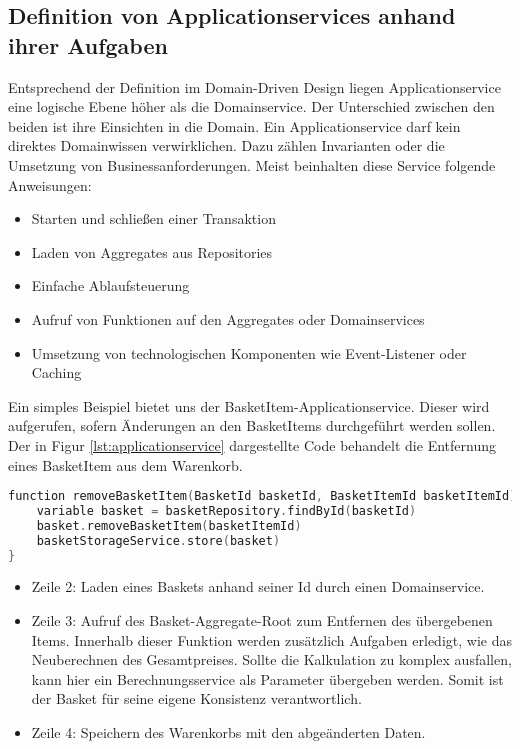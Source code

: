\subsection{Definition von Applicationservices anhand ihrer Aufgaben}

Entsprechend der Definition im Domain-Driven Design liegen Applicationservice eine logische Ebene höher als die Domainservice. Der Unterschied zwischen den beiden ist ihre Einsichten in die Domain. Ein Applicationservice darf kein direktes Domainwissen verwirklichen. Dazu zählen Invarianten oder die Umsetzung von Businessanforderungen.
Meist beinhalten diese Service folgende Anweisungen:

\begin{itemize}[noitemsep,nolistsep]
	\item Starten und schließen einer Transaktion
	\item Laden von Aggregates aus Repositories
	\item Einfache Ablaufsteuerung
	\item Aufruf von Funktionen auf den Aggregates oder Domainservices
	\item Umsetzung von technologischen Komponenten wie Event-Listener oder Caching
\end{itemize}

Ein simples Beispiel bietet uns der BasketItem-Applicationservice. Dieser wird aufgerufen, sofern Änderungen an den BasketItems durchgeführt werden sollen. Der in Figur \ref{lst:applicationservice} dargestellte Code behandelt die Entfernung eines BasketItem aus dem Warenkorb.

\begin{minipage}{\linewidth} %
	\begin{lstlisting}[caption={Eine Beispielsfunktion des BasketItem-Applikationservice}, label={lst:applicationservice}, language=Kotlin]
function removeBasketItem(BasketId basketId, BasketItemId basketItemId) {
	variable basket = basketRepository.findById(basketId)
	basket.removeBasketItem(basketItemId)
	basketStorageService.store(basket)
}
	\end{lstlisting}
\end{minipage}

\begin{itemize}[noitemsep,nolistsep]
	\item Zeile 2: Laden eines Baskets anhand seiner Id durch einen Domainservice. 
	\item Zeile 3: Aufruf des Basket-Aggregate-Root zum Entfernen des übergebenen Items. Innerhalb dieser Funktion werden zusätzlich Aufgaben erledigt, wie das Neuberechnen des Gesamtpreises. Sollte die Kalkulation zu komplex ausfallen, kann hier ein Berechnungsservice als Parameter übergeben werden. Somit ist der Basket für seine eigene Konsistenz verantwortlich. 
	\item Zeile 4: Speichern des Warenkorbs mit den abgeänderten Daten.
\end{itemize}


